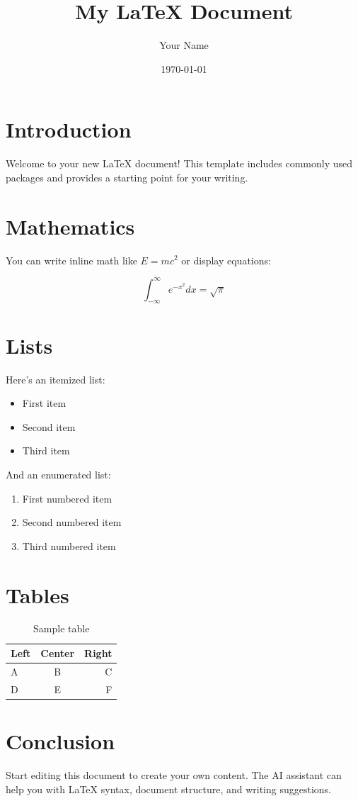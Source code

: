 \documentclass{article}
\title{My LaTeX Document}
\author{Your Name}
\date{\today}
\begin{document}
\maketitle

\section{Introduction}

Welcome to your new LaTeX document! This template includes commonly used packages and provides a starting point for your writing.

\section{Mathematics}

You can write inline math like $E = mc^2$ or display equations:

\begin{equation}
    \int_{-\infty}^{\infty} e^{-x^2} dx = \sqrt{\pi}
\end{equation}

\section{Lists}

Here's an itemized list:
\begin{itemize}
    \item First item
    \item Second item
    \item Third item
\end{itemize}

And an enumerated list:
\begin{enumerate}
    \item First numbered item
    \item Second numbered item
    \item Third numbered item
\end{enumerate}

\section{Tables}

\begin{table}[h]
\centering
\begin{tabular}{|l|c|r|}
\hline
Left & Center & Right \\
\hline
A & B & C \\
D & E & F \\
\hline
\end{tabular}
\caption{Sample table}
\label{tab:sample}
\end{table}

\section{Conclusion}

Start editing this document to create your own content. The AI assistant can help you with LaTeX syntax, document structure, and writing suggestions.
\end{document}
